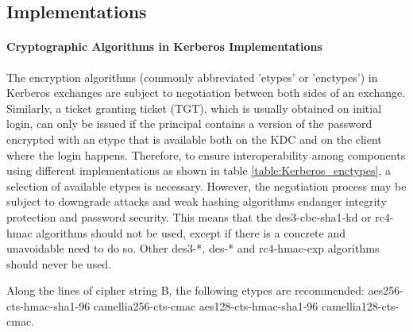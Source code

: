 \subsection{Implementations}
\label{subsection:kerberos_implementations}

\paragraph{Cryptographic Algorithms in Kerberos Implementations}

The encryption algorithms (commonly abbreviated 'etypes' or 'enctypes') in Kerberos exchanges are subject to negotiation between both sides of an exchange. Similarly, a ticket granting ticket (TGT), which is usually obtained on initial login, can only be issued if the principal contains a version of the password encrypted with an etype that is available both on the KDC and on the client where the login happens. Therefore, to ensure interoperability among components using different implementations as shown in table \ref{table:Kerberos_enctypes}, a selection of available etypes is necessary. However, the negotiation process may be subject to downgrade attacks\cite{AttKerbDepl} and weak hashing algorithms endanger integrity protection and password security. This means that the des3-cbc-sha1-kd or rc4-hmac algorithms should not be used, except if there is a concrete and unavoidable need to do so. Other des3-*, des-* and rc4-hmac-exp algorithms should never be used.

Along the lines of cipher string B, the following etypes are recommended: aes256-cts-hmac-sha1-96 camellia256-cts-cmac aes128-cts-hmac-sha1-96 camellia128-cts-cmac.


